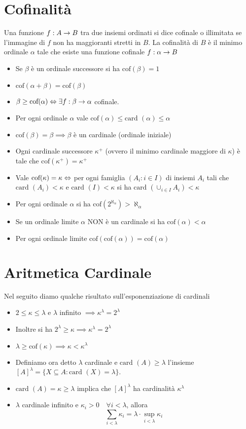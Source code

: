 \documentclass[a4paper,NoNotes,GeneralMath]{stdmdoc}
\newcommand{\card}[1]{\text{card }({#1})}
\newcommand{\cof}[1]{\text{cof}({#1})}
\begin{document}
	\section*{Cofinalità}
	Una funzione $f: A \rightarrow B$ tra due insiemi ordinati si dice cofinale o illimitata se l'immagine di $f$ non ha maggioranti stretti in $B$. La cofinalità di $B$ è il minimo ordinale $\alpha$ tale che esiste una funzione cofinale $f: \alpha \rightarrow B$
	\begin{itemize}
		\item Se $\beta$ è un ordinale successore si ha $\cof{\beta} = 1$
		\item $\cof{\alpha + \beta} = \cof{\beta}$
		\item $\beta \ge \cof{\alpha} \sse \exists f: \beta \rar \alpha$ cofinale.
		\item Per ogni ordinale $\alpha$ vale $\cof{\alpha} \le \card{\alpha} \le \alpha$
		\item $\cof{\beta} = \beta \implies \beta$ è un cardinale (ordinale iniziale)
		\item Ogni cardinale successore $\kappa^{+}$ (ovvero il minimo cardinale maggiore di $\kappa$) è tale che $\cof{\kappa^{+}} = \kappa^{+}$
		\item Vale $\cof{\kappa} = \kappa \sse $ per ogni famiglia $(A_i : i \in I)$ di insiemi $A_i$ tali che $\card{A_i} < \kappa$ e $\card{I} < \kappa$ si ha $\card{\cup_{i \in I} A_i} < \kappa$
		\item Per ogni ordinale $\alpha$ si ha $\cof{2^{\aleph_\alpha}} > \aleph_\alpha$
		\item Se un ordinale limite $\alpha$ NON è un cardinale si ha $\cof{\alpha} < \alpha$
		\item Per ogni ordinale limite $\cof{\cof{\alpha}} = \cof{\alpha}$
	\end{itemize}
	
	\section*{Aritmetica Cardinale}
	Nel seguito diamo qualche risultato sull'esponenziazione di cardinali
	\begin{itemize}
		\item $2 \le \kappa \le \lambda$ e $\lambda$ infinito $\implies \kappa^\lambda = 2^\lambda$
		\item Inoltre si ha $2^\lambda \ge \kappa \implies \kappa^\lambda = 2^\lambda$
		\item $\lambda \ge \cof{\kappa} \implies \kappa < \kappa^\lambda$
		\item Definiamo ora detto $\lambda$ cardinale e $\card{A} \ge \lambda$ l'insieme $[A]^\lambda = \{ X \subseteq A : \card{X} = \lambda \}$.
		\item $\card{A} = \kappa \ge \lambda$ implica che $[A]^\lambda$ ha cardinalità $\kappa^\lambda$
		\item $\lambda$ cardinale infinito e $\kappa_i > 0 \quad \forall i < \lambda$, allora $$ \sum_{i < \lambda} \kappa_i = \lambda \cdot \sup_{i < \lambda} \kappa_i $$ 
	\end{itemize}
	
\end{document}
